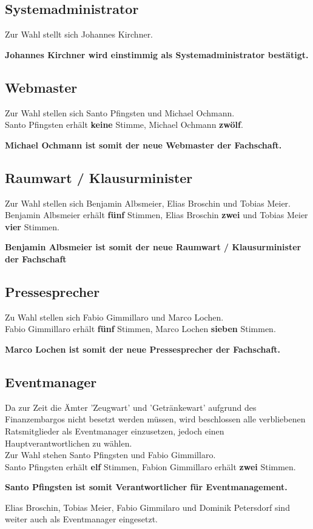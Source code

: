 \documentclass[a4paper, 11pt]{article} %
\begin{document}
\subsection{Systemadministrator}
Zur Wahl stellt sich Johannes Kirchner.
\begin{center}
	\textbf{Johannes Kirchner wird einstimmig als Systemadministrator bestätigt.}
\end{center}

\subsection{Webmaster}
Zur Wahl stellen sich Santo Pfingsten und Michael Ochmann.\\
Santo Pfingsten erhält \textbf{keine} Stimme, Michael Ochmann \textbf{zwölf}.
\begin{center}
	\textbf{Michael Ochmann ist somit der neue Webmaster der Fachschaft.}
\end{center} 

\subsection{Raumwart / Klausurminister}
Zur Wahl stellen sich Benjamin Albsmeier, Elias Broschin und Tobias Meier.\\
Benjamin Albsmeier erhält \textbf{fünf} Stimmen, Elias Broschin \textbf{zwei} und Tobias Meier \textbf{vier} Stimmen.
\begin{center}
	\textbf{Benjamin Albsmeier ist somit der neue Raumwart / Klausurminister der Fachschaft}
\end{center}

\subsection{Pressesprecher}
Zu Wahl stellen sich Fabio Gimmillaro und Marco Lochen.\\
Fabio Gimmillaro erhält \textbf{fünf} Stimmen, Marco Lochen \textbf{sieben} Stimmen.
\begin{center}
	\textbf{Marco Lochen ist somit der neue Pressesprecher der Fachschaft.}
\end{center}

\subsection{Eventmanager}
Da zur Zeit die Ämter 'Zeugwart' und 'Getränkewart' aufgrund des Finanzembargos nicht besetzt werden müssen, wird beschlossen alle verbliebenen Ratsmitglieder als Eventmanager einzusetzen, jedoch einen Hauptverantwortlichen zu wählen.\\
Zur Wahl stehen Santo Pfingsten und Fabio Gimmillaro.\\
Santo Pfingsten erhält \textbf{elf} Stimmen, Fabion Gimmillaro erhält \textbf{zwei} Stimmen.
\begin{center}
	\textbf{Santo Pfingsten ist somit Verantwortlicher für Eventmanagement.}
\end{center}
Elias Broschin, Tobias Meier, Fabio Gimmilaro und Dominik Petersdorf sind weiter auch als Eventmanager eingesetzt.
\end{document}
